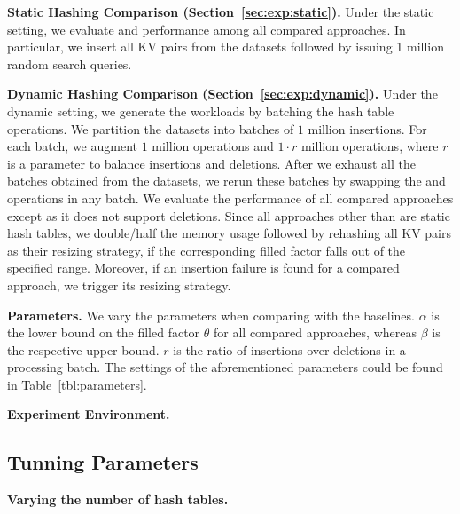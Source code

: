 \vspace{1mm}\noindent\textbf{Static Hashing Comparison (Section~\ref{sec:exp:static}).}
Under the static setting, we evaluate  and  performance among all compared approaches. 
In particular, we insert all KV pairs from the datasets followed by issuing 1 million random search queries. 

\vspace{1mm}\noindent\textbf{Dynamic Hashing Comparison (Section~\ref{sec:exp:dynamic}).}
Under the dynamic setting, we generate the workloads by batching the hash table operations. 
We partition the datasets into batches of $1$ million insertions. 
For each batch, we augment $1$ million  operations and $1 \cdot r$ million  operations,
where $r$ is a parameter to balance insertions and deletions.
After we exhaust all the batches obtained from the datasets, we rerun these batches by swapping the  and  operations in any batch. 
We evaluate the performance of all compared approaches except \cudpp as it does not support deletions. 
Since all approaches other than \voter are static hash tables, we double/half the memory usage followed by rehashing all KV pairs as their resizing strategy, if the corresponding filled factor falls out of the specified range. 
Moreover, if an insertion failure is found for a compared approach, we trigger its resizing strategy.


\vspace{1mm}\noindent\textbf{Parameters.}
We vary the parameters when comparing \voter with the baselines.
$\alpha$ is the lower bound on the filled factor $\theta$ for all compared approaches,
whereas $\beta$ is the respective upper bound.
$r$ is the ratio of insertions over deletions in a processing batch. 
The settings of the aforementioned parameters could be found in Table~\ref{tbl:parameters}.

\vspace{1mm}\noindent\textbf{Experiment Environment.}

\subsection{Tunning Parameters}
\vspace{1mm}\noindent\textbf{Varying the number of hash tables.}

